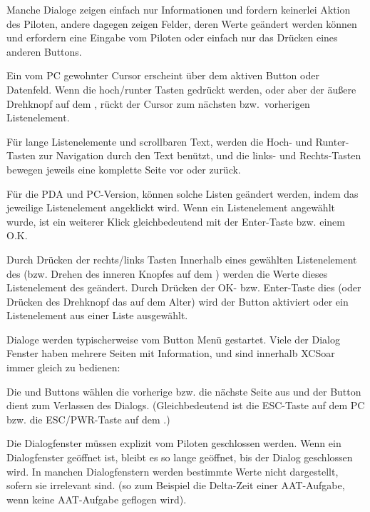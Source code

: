 Manche Dialoge zeigen einfach nur Informationen und fordern keinerlei Aktion des Piloten, andere dagegen zeigen Felder, deren Werte geändert werden können und erfordern eine Eingabe vom Piloten oder einfach nur das Drücken eines anderen Buttons.

Ein vom \textsf{PC} gewohnter Cursor erscheint über dem aktiven Button oder Datenfeld.
Wenn die hoch/runter Tasten gedrückt werden, oder aber der äußere Drehknopf auf dem \al, rückt der Cursor zum nächsten bzw.\ vorherigen Listenelement.

Für lange Listenelemente und scrollbaren Text, werden die Hoch- und Runter-Tasten zur Navigation durch den Text benützt, und die links- und Rechts-Tasten bewegen jeweils eine komplette Seite vor oder zurück.

Für die PDA und \textsf{PC}-Version, können solche Listen geändert werden, indem das jeweilige Listenelement angeklickt wird.
Wenn ein Listenelement angewählt wurde, ist ein weiterer Klick gleichbedeutend mit der Enter-Taste bzw. einem O.K.

Durch Drücken der rechts/links Tasten Innerhalb eines gewählten Listenelement des (bzw. Drehen des inneren Knopfes auf dem \al) werden die Werte dieses Listenelement des geändert. Durch Drücken der OK- bzw. Enter-Taste dies (oder Drücken des Drehknopf das auf dem Alter) wird der Button aktiviert oder ein Listenelement aus einer Liste ausgewählt.

Dialoge werden typischerweise vom Button Menü gestartet. Viele der Dialog Fenster haben mehrere Seiten mit Information, und sind innerhalb \textsf{XCSoar} immer gleich zu bedienen:

Die \button{$<$} und \button{$>$} Buttons wählen die vorherige bzw. die nächste Seite aus und der
 Button dient  zum Verlassen des Dialogs. (Gleichbedeutend ist die ESC-Taste auf dem \textsf{PC} bzw. die ESC/PWR-Taste  auf dem \al.)

Die Dialogfenster müssen explizit vom Piloten geschlossen werden. Wenn ein Dialogfenster geöffnet ist, bleibt es so lange geöffnet, bis der Dialog geschlossen wird. In manchen Dialogfenstern werden bestimmte  Werte nicht dargestellt, sofern sie irrelevant sind. (so zum Beispiel die Delta-Zeit einer AAT-Aufgabe, wenn keine AAT-Aufgabe geflogen wird).

